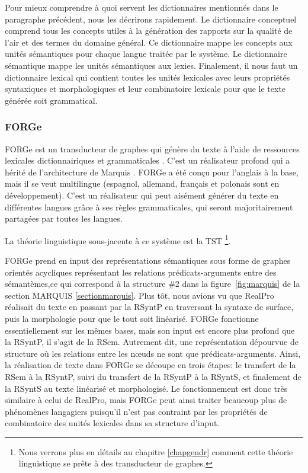 Pour mieux comprendre à quoi servent les dictionnaires mentionnés dans le paragraphe précédent, nous les décrirons rapidement. Le dictionnaire conceptuel comprend tous les concepts utiles à la génération des rapports sur la qualité de l'air et des termes du domaine général. Ce dictionnaire mappe les concepts aux unités sémantiques pour chaque langue traitée par le système. Le dictionnaire sémantique mappe les unités sémantiques aux lexies. Finalement, il nous faut un dictionnaire lexical qui contient toutes les unités lexicales avec leurs propriétés syntaxiques et morphologiques et leur combinatoire lexicale pour que le texte générée soit grammatical.

\subsubsection{FORGe}
FORGe est un transducteur de graphes qui génère du texte à l'aide de ressources lexicales dictionnairiques et grammaticales \citep{MilledemoFORGePompeu2017,DBLP:conf/semeval/MilleCBW17}. C'est un réalisateur profond qui a hérité de l'architecture de Marquis \citep{WannerMARQUISGENERATIONUSERTAILORED2010}. FORGe a été conçu pour l'anglais à la base, mais il se veut multilingue (espagnol, allemand, français et polonais sont en développement). C'est un réalisateur qui peut aisément générer du texte en différentes langues grâce à ses règles grammaticales, qui seront majoritairement partagées par toutes les langues.

La théorie linguistique sous-jacente à ce système est la \ac{TST} \citep{melcuk1988, mel2012semantics, PolgueretheorieSensTexte1998, kahane05a, Milicevic2007ASG} \footnote{Nous verrons plus en détails au chapitre \ref{chapgendr} comment cette théorie linguistique se prête à des transducteur de graphes.}.

FORGe prend en input des représentations sémantiques sous forme de graphes orientés acycliques représentant les relations prédicats-arguments entre des sémantèmes,ce qui correspond à la structure \#2 dans la figure~\ref{fig:marquis} de la section MARQUIS \ref{sectionmarquis}. Plus tôt, nous avions vu que RealPro \citep{LavoieFastPortableRealizer1997} réalisait du texte en passant par la \ac{RSyntP} en traversant la syntaxe de surface, puis la morphologie pour que le tout soit linéarisé. FORGe fonctionne essentiellement sur les mêmes bases, mais son input est encore plus profond que la \ac{RSyntP}, il s'agit de la \ac{RSem}. Autrement dit, une représentation dépourvue de structure où les relations entre les n\oe{}uds ne sont que prédicats-arguments. Ainsi, la réalisation de texte dans FORGe se découpe en trois étapes: le transfert de la \ac{RSem} à la \ac{RSyntP}, suivi du transfert de la \ac{RSyntP} à la \ac{RSyntS}, et finalement de la \ac{RSyntS} au texte linéarisé et morphologisé. Le fonctionnement est donc très similaire à celui de RealPro, mais FORGe peut ainsi traiter beaucoup plus de phénomènes langagiers puisqu'il n'est pas contraint par les propriétés de combinatoire des unités lexicales dans sa structure d'input.

